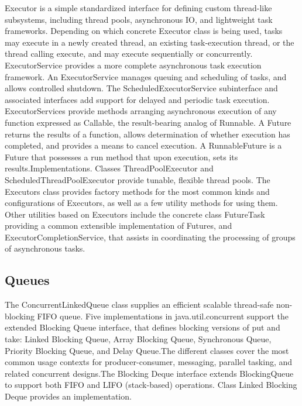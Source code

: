\documentclass[12pt,a4paper]{report}%
\begin{document}
Executor is a simple standardized interface for defining custom thread-like subsystems, including thread pools, asynchronous IO, and lightweight task frameworks. Depending on which concrete Executor class is being used, tasks may execute in a newly created thread, an existing task-execution thread, or the thread calling execute, and may execute sequentially or concurrently. ExecutorService provides a more complete asynchronous task execution framework. An ExecutorService manages queuing and scheduling of tasks, and allows controlled shutdown. The ScheduledExecutorService subinterface and associated interfaces add support for delayed and periodic task execution. ExecutorServices provide methods arranging asynchronous execution of any function expressed as Callable, the result-bearing analog of Runnable. A Future returns the results of a function, allows determination of whether execution has completed, and provides a means to cancel execution. A RunnableFuture is a Future that possesses a run method that upon execution, sets its results.Implementations. Classes ThreadPoolExecutor and ScheduledThreadPoolExecutor provide tunable, flexible thread pools. The Executors class provides factory methods for the most common kinds and configurations of Executors, as well as a few utility methods for using them. Other utilities based on Executors include the concrete class FutureTask providing a common extensible implementation of Futures, and ExecutorCompletionService, that assists in coordinating the processing of groups of asynchronous tasks.


\subsection{Queues}
The ConcurrentLinkedQueue class supplies an efficient scalable thread-safe non-blocking FIFO queue.
Five implementations in java.util.concurrent support the extended Blocking Queue interface, that defines blocking versions of put and take: Linked Blocking Queue, Array Blocking Queue, Synchronous Queue, Priority Blocking Queue, and Delay Queue.The different classes cover the most common usage contexts for producer-consumer, messaging, parallel tasking, and related concurrent designs.The Blocking Deque interface extends BlockingQueue to support both FIFO and LIFO (stack-based) operations. Class Linked Blocking Deque provides an implementation.
\end{document}
